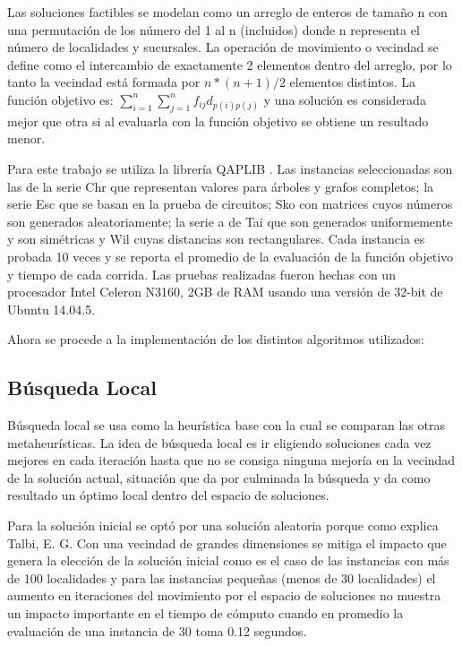 \documentclass{ci5652}
\begin{document}
Las soluciones factibles se modelan como un arreglo de enteros de tamaño n con una permutación de los número del 1 al n (incluidos) donde n representa el número de localidades y sucursales. La operación de movimiento o vecindad se define como el intercambio de exactamente 2 elementos dentro del arreglo, por lo tanto la vecindad está formada por $n*(n+1)/2$ elementos distintos. La función objetivo es: $\sum_{i=1}^{n} \sum_{j=1}^{n} f_{ij} d_{p(i)p(j)}$  y una solución es considerada mejor que otra si al evaluarla con la función objetivo se obtiene un resultado menor. 

Para este trabajo se utiliza la librería QAPLIB \cite{5}. Las instancias seleccionadas son las de la serie Chr que representan valores para árboles y grafos completos; la serie Esc que se basan en la prueba de circuitos; Sko con matrices cuyos números son generados aleatoriamente; la serie a de Tai que son generados uniformemente y son simétricas y Wil cuyas distancias son rectangulares.  Cada instancia es probada 10 veces y se reporta el promedio de la evaluación de la función objetivo y tiempo de cada corrida. Las pruebas realizadas fueron hechas con un procesador Intel Celeron N3160, 2GB de RAM usando una versión de 32-bit de Ubuntu 14.04.5.

Ahora se procede a la implementación de los distintos algoritmos utilizados:

\subsection{Búsqueda Local}

Búsqueda local se usa como la heurística base con la cual se comparan las otras metaheurísticas. La idea de búsqueda local es ir eligiendo soluciones cada vez mejores en cada iteración hasta que no se consiga ninguna mejoría en la vecindad de la solución actual, situación que da por culminada la búsqueda y da como resultado un óptimo local dentro del espacio de soluciones.

Para la solución inicial se optó por una solución aleatoria porque como explica Talbi, E. G. \cite{6} Con una vecindad de grandes dimensiones se mitiga el impacto que genera la elección de la solución inicial como es el caso de las instancias con más de 100 localidades y para las instancias pequeñas (menos de 30 localidades) el aumento en iteraciones del movimiento por el espacio de soluciones no muestra un impacto importante en el tiempo de cómputo cuando en promedio la evaluación de una instancia de 30 toma 0.12 segundos.
\end{document}
